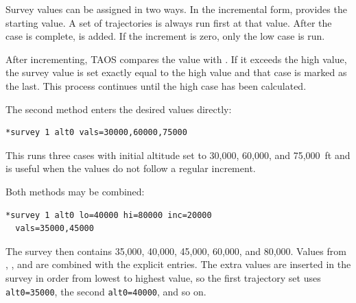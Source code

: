 
Survey values can be assigned in two ways. In the incremental form, 
provides the starting value. A set of trajectories is always run first at that value. After
the case is complete,  is added. If the increment is zero, only the low
case is run.

After incrementing, TAOS compares the value with . If it exceeds the
high value, the survey value is set exactly equal to the high value and that case is
marked as the last. This process continues until the high case has been calculated.


The second method enters the desired values directly:

\begin{lstlisting}[style=taosmanual]
*survey 1 alt0 vals=30000,60000,75000
\end{lstlisting}

This runs three cases with initial altitude set to 30,000, 60,000, and 75,000~ft and is
useful when the values do not follow a regular increment.

Both methods may be combined:

\begin{lstlisting}[style=taosmanual]
*survey 1 alt0 lo=40000 hi=80000 inc=20000
  vals=35000,45000
\end{lstlisting}

The survey then contains 35,000, 40,000, 45,000, 60,000, and 80,000. Values from
, , and  are combined with the explicit
 entries. The extra values are inserted in the survey in order from lowest to highest
value, so the first trajectory set uses \texttt{alt0=35000}, the second
\texttt{alt0=40000}, and so on.
